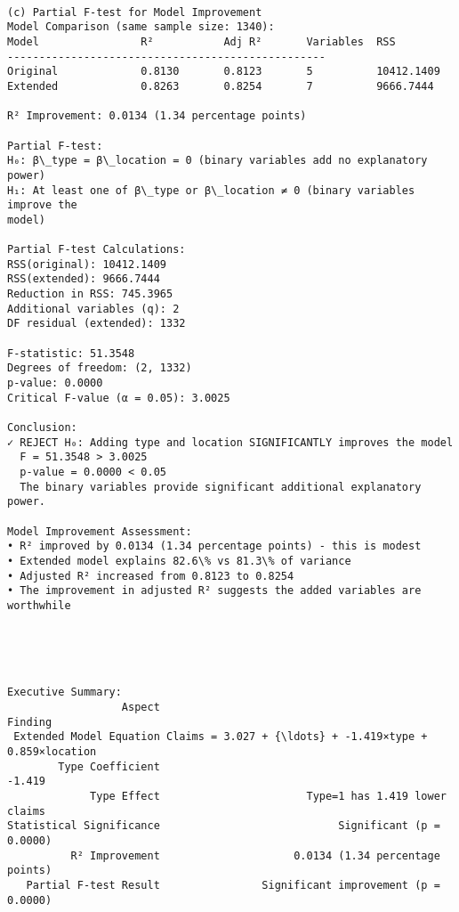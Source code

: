 \documentclass[8pt, twocolumn]{extarticle}
\begin{document}
    \begin{Verbatim}[commandchars=\\\{\}]

(c) Partial F-test for Model Improvement
Model Comparison (same sample size: 1340):
Model                R²           Adj R²       Variables  RSS
--------------------------------------------------
Original             0.8130       0.8123       5          10412.1409
Extended             0.8263       0.8254       7          9666.7444

R² Improvement: 0.0134 (1.34 percentage points)

Partial F-test:
H₀: β\_type = β\_location = 0 (binary variables add no explanatory power)
H₁: At least one of β\_type or β\_location ≠ 0 (binary variables improve the
model)

Partial F-test Calculations:
RSS(original): 10412.1409
RSS(extended): 9666.7444
Reduction in RSS: 745.3965
Additional variables (q): 2
DF residual (extended): 1332

F-statistic: 51.3548
Degrees of freedom: (2, 1332)
p-value: 0.0000
Critical F-value (α = 0.05): 3.0025

Conclusion:
✓ REJECT H₀: Adding type and location SIGNIFICANTLY improves the model
  F = 51.3548 > 3.0025
  p-value = 0.0000 < 0.05
  The binary variables provide significant additional explanatory power.

Model Improvement Assessment:
• R² improved by 0.0134 (1.34 percentage points) - this is modest
• Extended model explains 82.6\% vs 81.3\% of variance
• Adjusted R² increased from 0.8123 to 0.8254
• The improvement in adjusted R² suggests the added variables are worthwhile
    \end{Verbatim}

    \begin{center}
    \end{center}
    { \hspace*{\fill} \\}
    
    \begin{Verbatim}[commandchars=\\\{\}]


Executive Summary:
                  Aspect                                             Finding
 Extended Model Equation Claims = 3.027 + {\ldots} + -1.419×type + 0.859×location
        Type Coefficient                                              -1.419
             Type Effect                       Type=1 has 1.419 lower claims
Statistical Significance                            Significant (p = 0.0000)
          R² Improvement                     0.0134 (1.34 percentage points)
   Partial F-test Result                Significant improvement (p = 0.0000)
    \end{Verbatim}
\end{document}
